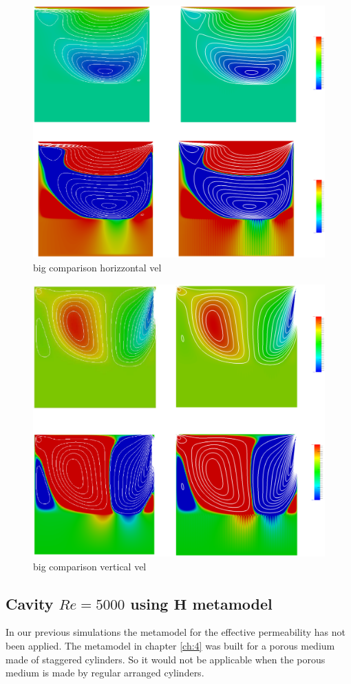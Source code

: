 \begin{figure}
	\centering
	\includegraphics[width=0.9\linewidth]{chapter_5/figure/re_100_big/ux}
	\caption{big comparison horizzontal vel}
	\label{fig:ux}
\end{figure}

\begin{figure}
	\centering
	\includegraphics[width=0.9\linewidth]{chapter_5/figure/re_100_big/uy}
	\caption{big comparison vertical vel}
	\label{fig:uy}
\end{figure}


\subsection{Cavity $Re=5000$ using $\mathbf{H}$ metamodel}
\label{pr:mata_cav}
In our previous simulations the metamodel for the effective permeability has not been applied.  The metamodel in chapter \ref{ch:4} was built for a porous medium made of staggered cylinders. So it would not be applicable when the porous medium is made by regular arranged cylinders.

